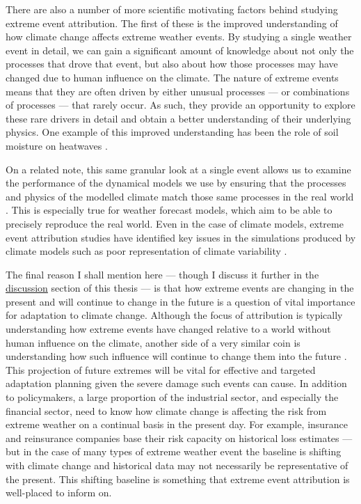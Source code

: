   There are also a number of more scientific motivating factors behind studying extreme event attribution. The first of these is the improved understanding of how climate change affects extreme weather events. By studying a single weather event in detail, we can gain a significant amount of knowledge about not only the processes that drove that event, but also about how those processes may have changed due to human influence on the climate. The nature of extreme events means that they are often driven by either unusual processes --- or combinations of processes --- that rarely occur. As such, they provide an opportunity to explore these rare drivers in detail and obtain a better understanding of their underlying physics. One example of this improved understanding has been the role of soil moisture on heatwaves \citep{fischer_soil_2007,fischer_contribution_2007,wehrli_identifying_2019}. %

  On a related note, this same granular look at a single event allows us to examine the performance of the dynamical models we use by ensuring that the processes and physics of the modelled climate match those same processes in the real world \citep{sillmann_understanding_2017,philip_protocol_2020}. This is especially true for weather forecast models, which aim to be able to precisely reproduce the real world. Even in the case of climate models, extreme event attribution studies have identified key issues in the simulations produced by climate models such as poor representation of climate variability \citep{bellprat_towards_2019,leach_anthropogenic_2020}.

  The final reason I shall mention here --- though I discuss it further in the \hyperref[discussion]{discussion} section of this thesis --- is that how extreme events are changing in the present and will continue to change in the future is a question of vital importance for adaptation to climate change. Although the focus of attribution is typically understanding how extreme events have changed relative to a world without human influence on the climate, another side of a very similar coin is understanding how such influence will continue to change them into the future \citep{harrington_integrating_2022}. This projection of future extremes will be vital for effective and targeted adaptation planning given the severe damage such events can cause. In addition to policymakers, a large proportion of the industrial sector, and especially the financial sector, need to know how climate change is affecting the risk from extreme weather on a continual basis in the present day. For example, insurance and reinsurance companies base their risk capacity on historical loss estimates --- but in the case of many types of extreme weather event the baseline is shifting with climate change and historical data may not necessarily be representative of the present. This shifting baseline is something that extreme event attribution is well-placed to inform on.

